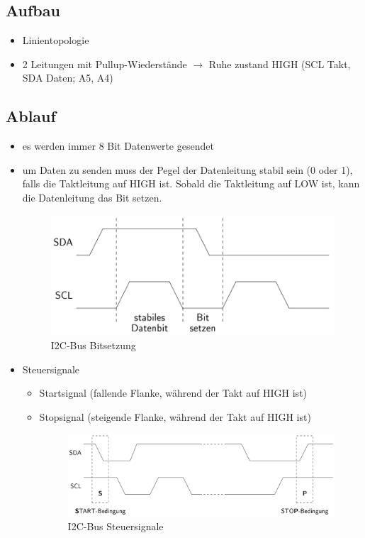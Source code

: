 \subsection*{Aufbau}
\begin{itemize}
	\item Linientopologie
	\item 2 Leitungen mit Pullup-Wiederstände $\rightarrow$ Ruhe zustand HIGH (SCL Takt, SDA Daten; A5, A4)
\end{itemize}

\subsection*{Ablauf}
\begin{itemize}
	\item es werden immer 8 Bit Datenwerte gesendet
	\item um Daten zu senden muss der Pegel der Datenleitung stabil sein (0 oder 1), falls die Taktleitung auf HIGH ist. Sobald die Taktleitung auf LOW ist, kann die Datenleitung das Bit setzen.
	\begin{figure}[H]
		\centering
		\includegraphics[width=0.8\linewidth]{figures/i2c2.png}
		\caption{I2C-Bus Bitsetzung}
	\end{figure}
	\item Steuersignale
	\begin{itemize}
		\item Startsignal (fallende Flanke, während der Takt auf HIGH ist)
		\item Stopsignal (steigende Flanke, während der Takt auf HIGH ist)
		\begin{figure}[H]
			\centering
			\includegraphics[width=0.8\linewidth]{figures/i2c3.png}
			\caption{I2C-Bus Steuersignale}
		\end{figure}
	\end{itemize}
\end{itemize}

